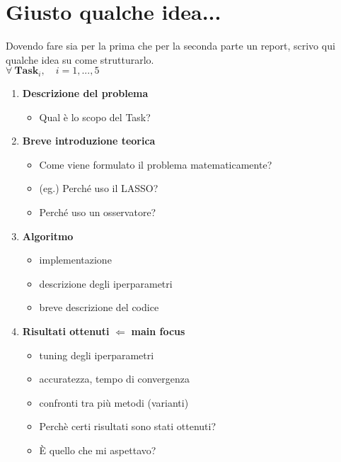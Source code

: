 \documentclass[a4paper, 12pt]{article}
\begin{document}
\Large{
    \section*{Giusto qualche idea...}
    Dovendo fare sia per la prima che per la seconda parte un report, scrivo qui qualche idea su come strutturarlo.\\
    
    {\huge{
        $\forall \  \textbf{Task}_i, \quad i=1,...,5$
    }}
    
\indent
    \begin{enumerate}
        \item \textbf{Descrizione del problema}
        \begin{itemize}
            \item Qual \`e lo scopo del Task?
        \end{itemize}
        \item \textbf{Breve introduzione teorica}
        \begin{itemize}
            \item Come viene formulato il problema matematicamente?
            \item (eg.) Perch\'e uso il LASSO?
            \item Perch\'e uso un osservatore?
        \end{itemize}
        \item \textbf{Algoritmo}
        \begin{itemize}
            \item implementazione
            \item descrizione degli iperparametri
            \item breve descrizione del codice
        \end{itemize}
        \item \textbf{Risultati ottenuti} $\Longleftarrow$ {\color{red} \textbf{main focus}}
        \begin{itemize}
            \item tuning degli iperparametri
            \item accuratezza, tempo di convergenza
            \item confronti tra pi\`u metodi (varianti)
            \item Perch\`e certi risultati sono stati ottenuti?
            \item \`E quello che mi aspettavo?
        \end{itemize}
    \end{enumerate}

}
\end{document}

